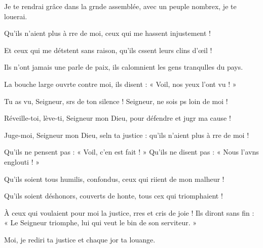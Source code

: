 \item Je te rendrai grâce dans la grnde assemblée,\psstar{} avec un peuple nombrex, je te louerai.
\item Qu’ils n’aient plus à rre de moi,\psstar{} ceux qui me hassent injustement !
\item Et ceux qui me détstent sans raison,\psstar{} qu’ils cssent leurs clins d’œil !
\item Ils n’ont jamais une parle de paix,\psstar{} ils calomnient les gens tranqulles du pays.
\item La bouche large ouvrte contre moi,\psstar{} ils disent : « Voil, nos yeux l’ont vu ! »
\item Tu as vu, Seigneur, srs de ton silence !\psstar{} Seigneur, ne sois ps loin de moi !
\item Réveille-toi, lève-ti, Seigneur mon Dieu,\psstar{} pour défendre et jugr ma cause !
\item Juge-moi, Seigneur mon Dieu, seln ta justice :\psstar{} qu’ils n’aient plus à rre de moi !
\item Qu’ils ne pensent pas : « Voil, c’en est fait ! »\psstar{} Qu’ils ne disent pas : « Nous l’avns englouti ! »
\item Qu’ils soient tous humilis, confondus,\psstar{} ceux qui riient de mon malheur !
\item Qu’ils soient déshonors, couverts de honte,\psstar{} tous cex qui triomphaient !
\item À ceux qui voulaient pour moi la justice, rres et cris de joie !\psstar{} Ils diront sans fin : « Le Seigneur triomphe, lui qui veut le bin de son serviteur. »
\item Moi, je rediri ta justice\psstar{} et chaque jor ta louange.